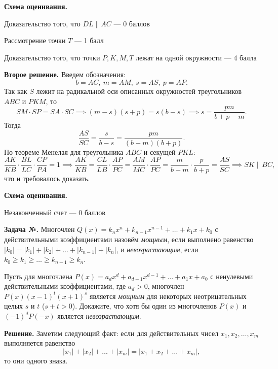 \documentclass[12pt]{article}
\newcounter{zadacha}
\newcommand{\z}{\par  \smallskip \noindent \refstepcounter{zadacha}%
\textbf{Задача №\arabic{zadacha}.} }
\def\sol{\par \bigskip \noindent \textbf{Решение. }}
\def\solII{\par \noindent \textbf{Второе решение. }}
\begin{document}
\bigskip

\textbf{Схема оценивания.}
\begin{compactitem}
\item Доказательство того, что $DL \parallel AC$ --- 0 баллов
\item Рассмотрение точки $T$ --- 1 балл
\item Доказательство того, что точки $P, K, M, T$ лежат на одной окружности --- 4 балла
\end{compactitem}

\bigskip

\solII Введем обозначения:
\[b = AC, \ m = AM, \ s = AS, \ p = AP.\]
Так как $S$ лежит на радикальной оси описанных окружностей треугольников $ABC$ и $PKM$, то 
\[SM \cdot SP = SA \cdot SC \implies (m - s)(s + p) = s(b - s) \implies s = \frac{pm}{b + p - m}.\]
Тогда 
\[\frac{AS}{SC} = \frac{s}{b - s} = \frac{pm}{(b - m)(b + p)}.\]
По теореме Менелая для треугольника $ABC$ и секущей $PKL$:
\[\frac{AK}{KB} \cdot \frac{BL}{LC} \cdot \frac{CP}{PA} = 1 \implies \frac{AK}{KB} = \frac{CL}{LB} \cdot \frac{AP}{PC} = \frac{AM}{MC} \cdot \frac{AP}{PC} = \frac{m}{b - m} \cdot \frac{p}{b + p} = \frac{AS}{SC} \implies SK \parallel BC,\]
что и требовалось доказать.

\bigskip

\textbf{Схема оценивания.}
\begin{compactitem}
\item Незаконченный счет --- 0 баллов
\end{compactitem}

\bigskip

\z Многочлен $Q(x) = k_n x^n + k_{n-1} x^{n-1} + \ldots + k_1 x + k_0$ с действительными коэффициентами назовём \textit{мощным}, если выполнено равенство $|k_0| = |k_1| + |k_2| + \ldots + |k_{n-1}| + |k_n|$, и \textit{невозрастающим}, если $k_0 \geq k_1 \geq \ldots \geq k_{n-1} \geq k_n$. 

Пусть для многочлена $P(x) = a_d x^d + a_{d-1} x^{d-1} + \ldots + a_1 x + a_0$ с ненулевыми действительными коэффициентами, где $a_d > 0$, многочлен $P(x)(x-1)^t(x+1)^s$ является \textit{мощным} для некоторых неотрицательных целых $s$ и $t$ ($s + t > 0$). Докажите, что хотя бы один из многочленов $P(x)$ и $(-1)^d P(-x)$ является \textit{невозрастающим}. %

\bigskip

\sol Заметим следующий факт: если для действительных чисел $x_1, x_2, \ldots, x_m$ выполняется равенство
\[|x_1| + |x_2| + \ldots + |x_m| = |x_1 + x_2 + \ldots + x_m|,\]
то они одного знака.
\end{document}
